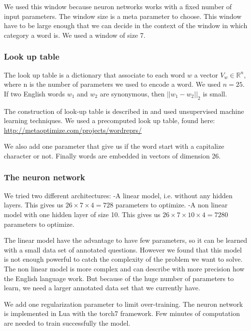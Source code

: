 We used this window because neuron networks works with a fixed number of input parameters. 
The window size is a meta parameter to choose. This window have to be large enough that we can decide in the context of the window in which category a word is. We used a window of size 7.

\subsubsection{Look up table}

The look up table is a dictionary that associate to each word $w$ a vector $V_w \in \mathbb{R}^n$, where n is the number of parameters we used to encode a word. We used $n=25$.
If two English words $w_1$ and $w_2$ are synonymous, then $||w_1-w_2||_2$ is small.

The construction of look-up table is described in \cite{collobert} and used unsupervised machine learning techniques.
We used a precomputed look up table, found here: \url{http://metaoptimize.com/projects/wordreprs/}

We also add one parameter that give us if the word start with a capitalize character or not. Finally words are embedded in vectors of dimension 26. 

\subsubsection{The neuron network}

We tried two different architectures:
-A linear model, i.e. without any hidden layers. This gives us $26\times 7\times 4 = 728$ parameters to optimize. 
-A non linear model with one hidden layer of size 10. This gives us $26\times 7\times 10\times 4 = 7280$ parameters to optimize.

The linear model have the advantage to have few parameters, so it can be learned with a small data set of annotated questions. However we found that this model is not enough powerful to catch the complexity of the problem we want to solve.
The non linear model is more complex and can describe with more precision how the English language work. But because of the huge number of parameters to learn, we need a larger annotated data set that we currently have.

We add one regularization parameter to limit over-training.
The neuron network is implemented in Lua with the torch7 framework.
Few minutes of computation are needed to train successfully the model.

